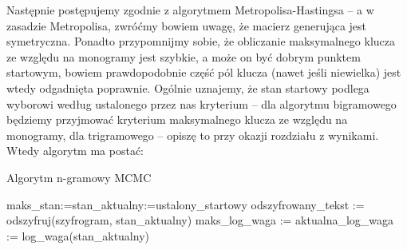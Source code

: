 \documentclass[a4paper]{article}
\theoremstyle{defn}
\theoremstyle{theorem}
\theoremstyle{lemma}
\theoremstyle{cor}
\theoremstyle{fact}
\begin{document}
Następnie postępujemy zgodnie z algorytmem Metropolisa-Hastingsa – a w zasadzie Metropolisa, zwróćmy bowiem uwagę, że macierz generująca jest symetryczna. Ponadto przypomnijmy sobie, że obliczanie maksymalnego klucza ze względu na monogramy jest szybkie, a może on być dobrym punktem startowym, bowiem prawdopodobnie część pól klucza (nawet jeśli niewielka) jest wtedy odgadnięta poprawnie. Ogólnie uznajemy, że stan startowy podlega wyborowi według ustalonego przez nas kryterium – dla algorytmu bigramowego będziemy przyjmować kryterium maksymalnego klucza ze względu na monogramy, dla trigramowego – opiszę to przy okazji rozdziału z wynikami. Wtedy algorytm ma postać:\\
\begin{algorithm}[H]
\caption{Algorytm n-gramowy MCMC}
maks\_stan:=stan\_aktualny:=ustalony\_startowy\;
odszyfrowany\_tekst := odszyfruj(szyfrogram, stan\_aktualny)\;
maks\_log\_waga := aktualna\_log\_waga := log\_waga(stan\_aktualny)\;
\end{algorithm}
\end{document}
